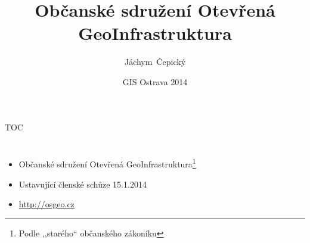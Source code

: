 \documentclass[xcolor=dvipsnames]{beamer}
\title{Občanské sdružení Otevřená GeoInfrastruktura}
\subtitle {}
\author[J. Čepický] %
{Jáchym~Čepický\inst{1}}
\institute %
{
  \inst{1}%
  OSGeo.cz
  \url{http://osgeo.cz}\\
}
\date[GIS Ostrava 2014] %
{GIS Ostrava 2014}
\begin{document}

\begin{frame}
  \titlepage
\end{frame}

\begin{frame}{TOC}
  \tableofcontents
\end{frame}





\section{}
\begin{frame}
\begin{itemize}
    \item Občanské sdružení Otevřená GeoInfrastruktura\footnote{Podle
    ,,starého`` občanského zákoníku}
    \item Ustavující členské schůze 15.1.2014
    \item \url{http://osgeo.cz}
\end{itemize}
\end{frame}
\end{document}
